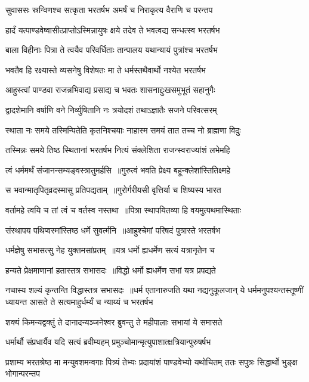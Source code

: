 \twolineshloka
{सुवाससः स्रग्विणश्च सत्कृता भरतर्षभ}
{अमर्षं च निराकृत्य वैराणि च परन्तप}


\twolineshloka
{हार्दं यत्पाण्डवेष्वासीत्प्राप्तोऽस्मिन्नायुषः क्षये}
{तदेव ते भवत्वद्य सन्धत्स्व भरतर्षभ}


\twolineshloka
{बाला विहीनाः पित्रा ते त्वयैव परिवर्धिताः}
{तान्पालय यथान्यायं पुत्रांश्च भरतर्षभ}


\twolineshloka
{भवतैव हि रक्ष्यास्ते व्यसनेषु विशेषतः}
{मा ते धर्मस्तथैवार्थो नश्येत भरतर्षभ}


\twolineshloka
{आहुस्त्वां पाण्डवा राजन्नभिवाद्य प्रसाद्य च}
{भवतः शासनाद्दुःखसमुभूतं सहानुगैः}


\twolineshloka
{द्वादशेमानि वर्षाणि वने निर्व्युषितानि नः}
{त्रयोदशं तथाऽज्ञातैः सजने परिवत्सरम्}


\twolineshloka
{स्थाता नः समये तस्मिन्पितेति कृतनिश्चयाः}
{नाहास्म समयं तात तच्च नो ब्राह्मणा विदुः}


\threelineshloka
{तस्मिन्नः समये तिष्ठ स्थितानां भरतर्षभ}
{नित्यं संक्लेशिता राजन्स्वराज्यांशं लभेमहि}
{}


\twolineshloka
{त्वं धर्ममर्थं संजानन्सम्यङ्वस्त्रातुमर्हसि ॥गुरुत्वं भवति प्रेक्ष्य बहून्क्लेशांस्तितिक्ष्महे}
{}


\twolineshloka
{स भवान्मातृपितृव्रदस्मासु प्रतिपद्यताम् ॥गुरोर्गरीयसी वृत्तिर्या च शिष्यस्य भारत}
{}


\twolineshloka
{वर्तामहे त्वयि च तां त्वं च वर्तस्व नस्तथा ॥पित्रा स्थापयितव्या हि वयमुत्पथमास्थिताः}
{}


\twolineshloka
{संस्थापय पथिप्वस्मांस्तिष्ठ धर्मे सुवर्त्मनि ॥आहुश्चेमां परिषदं पुत्रास्ते भरतर्षभ}
{}


\twolineshloka
{धर्मज्ञेषु सभासत्सु नेह युक्तमसांप्रतम् ॥यत्र धर्मो ह्यधर्मेण सत्यं यत्रानृतेन च}
{}


\twolineshloka
{हन्यते प्रेक्षमाणानां हतास्तत्र सभासदः ॥विद्धो धर्मो ह्यधर्मेण सभां यत्र प्रपद्यते}
{}


नचास्य शल्यं कृन्तन्ति विद्धास्तत्र सभासदः ॥धर्म एतानारुजति यथा नद्यनुकूलजान्
\twolineshloka
{ये धर्ममनुपश्यन्तस्तूष्णीं ध्यायन्त आसते}
{ते सत्यमाहुर्धर्म्यं च न्याय्यं च भरतर्षभ}


\twolineshloka
{शक्यं किमन्यद्वक्तुं ते दानादन्यञ्जनेश्वर}
{ब्रुवन्तु ते महीपालाः सभायां ये समासते}


\twolineshloka
{धर्मार्थौ संप्रधार्यैव यदि सत्यं ब्रवीम्यहम्}
{प्रमुञ्चोमान्मृत्युपाशात्क्षत्रियान्पुरुषर्षभ}


\threelineshloka
{प्रशाम्य भरतश्रेष्ठ मा मन्युवशमन्वगाः}
{पित्र्यं तेभ्यः प्रदायांशं पाण्डवेभ्यो यथोचितम्}
{ततः सपुत्रः सिद्धार्थो भुङ्क्ष भोगान्परन्तप}


